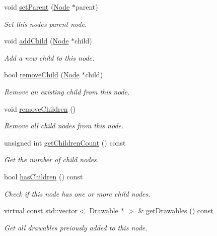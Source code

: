 \begin{DoxyCompactItemize}
void \mbox{\hyperlink{classec_1_1_node_a3c908e5f01e989cedfba5dc1a3ed66c1}{set\+Parent}} (\mbox{\hyperlink{classec_1_1_node}{Node}} $\ast$parent)
\begin{DoxyCompactList}\small\item\em Set this node\textquotesingle{}s parent node. \end{DoxyCompactList}\item 
void \mbox{\hyperlink{classec_1_1_node_a647bcdef4e01de3ecb34e0917ba9e333}{add\+Child}} (\mbox{\hyperlink{classec_1_1_node}{Node}} $\ast$child)
\begin{DoxyCompactList}\small\item\em Add a new child to this node. \end{DoxyCompactList}\item 
bool \mbox{\hyperlink{classec_1_1_node_ab0d856da4064db916e6fd4f9ad1ecafb}{remove\+Child}} (\mbox{\hyperlink{classec_1_1_node}{Node}} $\ast$child)
\begin{DoxyCompactList}\small\item\em Remove an existing child from this node. \end{DoxyCompactList}\item 
void \mbox{\hyperlink{classec_1_1_node_a4d9f13d7482fe4612ec2cffa8a06cc00}{remove\+Children}} ()
\begin{DoxyCompactList}\small\item\em Remove all child nodes from this node. \end{DoxyCompactList}\item 
unsigned int \mbox{\hyperlink{classec_1_1_node_a3fb0342e532d42984870f598ec4d0ba3}{get\+Children\+Count}} () const
\begin{DoxyCompactList}\small\item\em Get the number of child nodes. \end{DoxyCompactList}\item 
bool \mbox{\hyperlink{classec_1_1_node_ae1626b695c7c5f15af399772b51d0a5a}{has\+Children}} () const
\begin{DoxyCompactList}\small\item\em Check if this node has one or more child nodes. \end{DoxyCompactList}\item 
virtual const std\+::vector$<$ \mbox{\hyperlink{classec_1_1_drawable}{Drawable}} $\ast$ $>$ \& \mbox{\hyperlink{classec_1_1_node_a2403cd39000eceffdec878133f621e3a}{get\+Drawables}} () const
\begin{DoxyCompactList}\small\item\em Get all drawables preiously added to this node. \end{DoxyCompactList}\item 

\end{DoxyCompactItemize}
